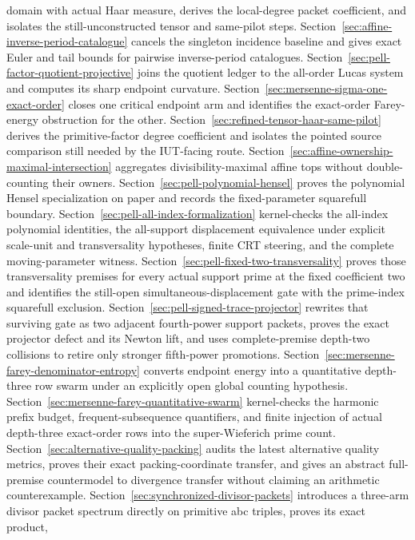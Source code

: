 \documentclass[11pt]{amsart}
\theoremstyle{definition}
\theoremstyle{remark}
\begin{document}
domain with actual Haar measure, derives the local-degree packet coefficient,
and isolates the still-unconstructed tensor and same-pilot steps.
Section~\ref{sec:affine-inverse-period-catalogue} cancels the singleton
incidence baseline and gives exact Euler and tail bounds for pairwise
inverse-period catalogues.
Section~\ref{sec:pell-factor-quotient-projective} joins the quotient ledger to
the all-order Lucas system and computes its sharp endpoint curvature.
Section~\ref{sec:mersenne-sigma-one-exact-order} closes one critical endpoint
arm and identifies the exact-order Farey-energy obstruction for the other.
Section~\ref{sec:refined-tensor-haar-same-pilot} derives the primitive-factor
degree coefficient and isolates the pointed source comparison still needed
by the IUT-facing route.
Section~\ref{sec:affine-ownership-maximal-intersection} aggregates
divisibility-maximal affine tops without double-counting their owners.
Section~\ref{sec:pell-polynomial-hensel} proves the polynomial Hensel
specialization on paper and records the fixed-parameter squarefull boundary.
Section~\ref{sec:pell-all-index-formalization} kernel-checks the all-index
polynomial identities, the all-support displacement equivalence under
explicit scale-unit and transversality hypotheses, finite CRT steering, and
the complete moving-parameter witness.
Section~\ref{sec:pell-fixed-two-transversality} proves those transversality
premises for every actual support prime at the fixed coefficient two and
identifies the still-open simultaneous-displacement gate with the prime-index
squarefull exclusion.
Section~\ref{sec:pell-signed-trace-projector} rewrites that surviving gate as
two adjacent fourth-power support packets, proves the exact projector defect
and its Newton lift, and uses complete-premise depth-two collisions to retire
only stronger fifth-power promotions.
Section~\ref{sec:mersenne-farey-denominator-entropy} converts endpoint energy
into a quantitative depth-three row swarm under an explicitly open global
counting hypothesis.
Section~\ref{sec:mersenne-farey-quantitative-swarm} kernel-checks the harmonic
prefix budget, frequent-subsequence quantifiers, and finite injection of
actual depth-three exact-order rows into the super-Wieferich prime count.
Section~\ref{sec:alternative-quality-packing} audits the latest alternative
quality metrics, proves their exact packing-coordinate transfer, and gives an
abstract full-premise countermodel to divergence transfer without claiming an
arithmetic counterexample.
Section~\ref{sec:synchronized-divisor-packets} introduces a three-arm divisor
packet spectrum directly on primitive abc triples, proves its exact product,
\end{document}
